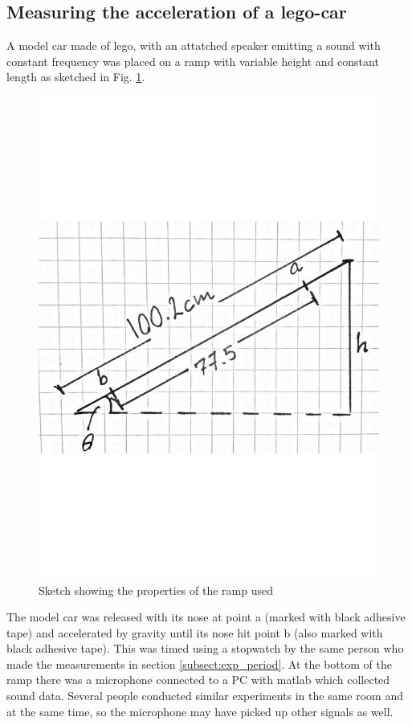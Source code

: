 \documentclass[11pt,a4paper]{article}
\begin{document}
  \subsection{Measuring the acceleration of a lego-car}
    A model car made of lego, with an attatched speaker emitting a sound with constant frequency was placed on a ramp with variable height and constant length as sketched in Fig. \ref{fig:rampsketch}.
    \begin{figure}[H]
      \center
      \includegraphics[scale=0.3]{scripts/figs/legodiag.pdf}
      \caption{Sketch showing the properties of the ramp used}
      \label{fig:rampsketch}
    \end{figure}
    The model car was released with its nose at point a (marked with black adhesive tape) and accelerated by gravity until its nose hit point b (also marked with black adhesive tape). This was timed using a stopwatch by the same person who made the measurements in section \ref{subsect:exp_period}. At the bottom of the ramp there was a microphone connected to a PC with matlab which collected sound data. Several people conducted similar experiments in the same room and at the same time, so the microphone may have picked up other signals as well.
\end{document}
